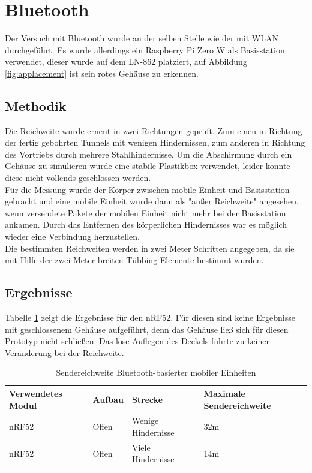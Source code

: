 \section{Bluetooth}
Der Versuch mit Bluetooth wurde an der selben Stelle wie der mit WLAN durchgeführt.
Es wurde allerdings ein Raspberry Pi Zero W als Basisstation verwendet, dieser wurde auf dem LN-862 platziert, auf Abbildung \ref{fig:applacement} ist sein rotes Gehäuse zu erkennen.

\subsection{Methodik}
Die Reichweite wurde erneut in zwei Richtungen geprüft. 
Zum einen in Richtung der fertig gebohrten Tunnels mit wenigen Hindernissen, zum anderen in Richtung des Vortriebs durch mehrere Stahlhindernisse.
Um die Abschirmung durch ein Gehäuse zu simulieren wurde eine stabile Plastikbox verwendet, leider konnte diese nicht vollends geschlossen werden.\\
Für die Messung wurde der Körper zwischen mobile Einheit und Basisstation gebracht und eine mobile Einheit wurde dann als "außer Reichweite" angesehen, wenn versendete Pakete der mobilen Einheit nicht mehr bei der Basisstation ankamen.
Durch das Entfernen des körperlichen Hindernisses war es möglich wieder eine Verbindung herzustellen.\\
Die bestimmten Reichweiten werden in zwei Meter Schritten angegeben, da sie mit Hilfe der zwei Meter breiten Tübbing Elemente bestimmt wurden.

\subsection{Ergebnisse}
Tabelle \ref{table:rangeblue} zeigt die Ergebnisse für den nRF52.
Für diesen sind keine Ergebnisse mit geschlossenem Gehäuse aufgeführt, denn das Gehäuse ließ sich für diesen Prototyp nicht schließen.
Das lose Auflegen des Deckels führte zu keiner Veränderung bei der Reichweite.

\begin{table}[h]
	\centering
	\caption{Sendereichweite Bluetooth-basierter mobiler Einheiten}
	\label{table:rangeblue}
	\begin{tabular}{p{3.5cm}|p{3cm}|p{3.5cm}|p{3cm}}
		Verwendetes Modul & Aufbau & Strecke & Maximale Sendereichweite \\
		\hline
		nRF52 & Offen & Wenige Hindernisse & 32m \\
		nRF52 & Offen & Viele Hindernisse & 14m \\
	\end{tabular}
\end{table}

